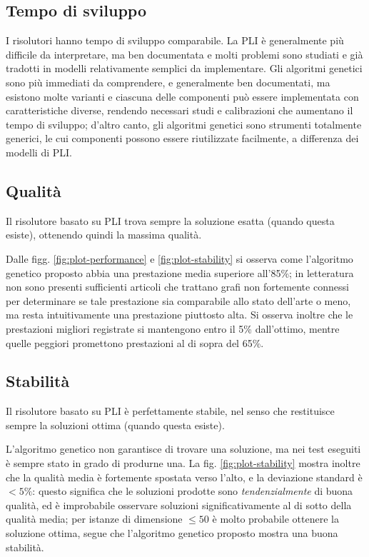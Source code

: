 \documentclass[a4paper, 10pt]{report}
\begin{document}
\subsection{Tempo di sviluppo}
I risolutori hanno tempo di sviluppo comparabile. La PLI è generalmente
più difficile da interpretare, ma ben documentata e molti problemi sono
studiati e già tradotti in modelli relativamente semplici da
implementare. Gli algoritmi genetici sono più immediati da comprendere,
e generalmente ben documentati, ma esistono molte varianti e ciascuna
delle componenti può essere implementata con caratteristiche diverse,
rendendo necessari studi e calibrazioni che aumentano il tempo di
sviluppo; d'altro canto, gli algoritmi genetici sono strumenti
totalmente generici, le cui componenti possono essere riutilizzate
facilmente, a differenza dei modelli di PLI.

\subsection{Qualità}
Il risolutore basato su PLI trova sempre la soluzione esatta (quando
questa esiste), ottenendo quindi la massima qualità.

Dalle figg. \ref{fig:plot-performance} e \ref{fig:plot-stability} si osserva come
l'algoritmo genetico proposto abbia una prestazione media superiore all'85\%;
in letteratura non sono presenti sufficienti articoli che trattano grafi
non fortemente connessi per determinare se tale prestazione sia comparabile
allo stato dell'arte o meno, ma resta intuitivamente una prestazione piuttosto
alta. Si osserva inoltre che le prestazioni migliori registrate si mantengono
entro il 5\% dall'ottimo, mentre quelle peggiori promettono prestazioni al di
sopra del 65\%.

\subsection{Stabilità}
Il risolutore basato su PLI è perfettamente stabile, nel senso che
restituisce sempre la soluzioni ottima (quando questa esiste).

L'algoritmo genetico non garantisce di trovare una soluzione, ma nei test
eseguiti è sempre stato in grado di produrne una. La fig. \ref{fig:plot-stability}
mostra inoltre che la qualità media è fortemente spostata verso l'alto, e
la deviazione standard è $< 5\%$: questo significa che le soluzioni
prodotte sono \emph{tendenzialmente} di buona qualità, ed è improbabile
osservare soluzioni significativamente al di sotto della qualità media;
per istanze di dimensione $\leq 50$ è molto probabile ottenere la soluzione ottima,
segue che l'algoritmo genetico proposto mostra una buona stabilità.
\end{document}
